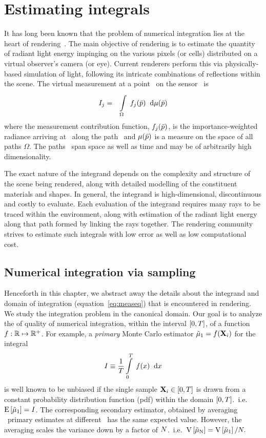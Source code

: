 \documentclass[11pt,fleqn]{book} %
\begin{document}
\chapter{Estimating integrals}
It has long been known that the problem of numerical integration lies at the heart of rendering~\cite{Perlin89Course}. The main objective of rendering is to estimate the quantity of radiant light energy impinging on the various pixels (or cells) distributed on a virtual observer's camera (or eye). Current renderers perform this via physically-based simulation of light, following its intricate combinations of reflections within the scene. The virtual measurement \Ij {\xs} at a point \xs\  on the sensor~\cite[ch.8]{Veach:1998:RMC:927297} is
\begin{eqnarray} \label{eq:measeq}
 I_{j} & = & \displaystyle\int\limits_{\Omega}^{} \; f_{j}(\bar{p}) \;\; \mathrm{d}\mu(\bar{p})
\end{eqnarray}
where the measurement contribution function, $f_{j}(\bar{p})$, is the importance-weighted radiance arriving at \xs\ along the path \pth\ and $\mu(\bar{p})$ is a measure on the space of all paths $\Omega$. The paths \pth\ span space as well as time and may be of arbitrarily high dimensionality. 

The exact nature of the integrand depends on the complexity and structure of the scene being rendered, along with detailed modelling of the constituent materials and shapes.  In general, the integrand is high-dimensional, discontinuous and costly to evaluate. Each evaluation of the integrand requires many rays to be traced within the environment, along with estimation of the radiant light energy along that path formed by linking the rays together. 
The rendering community strives to estimate such integrals with low error as well as low computational cost.


\section{Numerical integration via sampling}
Henceforth in this chapter, we abstract away the details about the integrand and domain of integration (equation~\ref{eq:measeq}) that is encountered in rendering. We study the integration problem in the canonical domain.  
Our goal is to analyze the of quality of numerical integration, within the interval $[0,T]$, of a function $f: \mathbb{R} \mapsto \mathbb{R}^{+}$. 
For example, a \textit{primary} Monte Carlo estimator $\tilde\mu_\mathrm{1} = f(\mathbf{X} _i)$ for the integral
\begin{equation} \label{eq:integcanonical}
I \equiv \frac 1 {T} \displaystyle\int\limits_{0}^{T} \; f(x)  \;\; \mathrm{d}x  
\end{equation}
is well known to be unbiased if the  single sample $\mathbf{X} _i \in [0,T] $ is drawn from a constant probability distribution function (pdf) within the domain $[0,T]$.~i.e.~$\mathrm{E} \left[\tilde\mu_\mathrm{1} \right] = I$.
The corresponding secondary estimator, obtained by averaging \N\ primary estimates at different \xii\ has the same expected value. However, the averaging scales the variance down by a factor of $N$.~i.e.~$\mathrm{V} \left[\tilde\mu_\mathrm{N}\right] = \mathrm{V} \left[\tilde\mu_\mathrm{1}\right]/N.$ 
\end{document}
